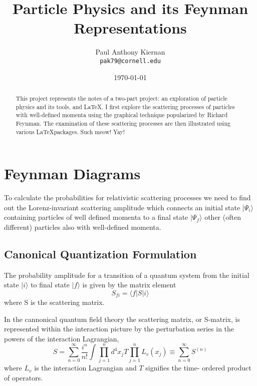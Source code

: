\documentclass[10pt,a4paper]{article}
\title{Particle Physics and its Feynman Representations}
\author{
    Paul Anthony Kiernan \\
    \texttt{pak79@cornell.edu}
}
\date{\today}
\begin{document}
    \unitlength=1mm

\maketitle

\begin{abstract}
    This project represents the notes of a two-part project: an exploration of
    particle physics and its tools, and \LaTeX. I first explore the scattering
    processes of particles with well-defined momenta using the graphical
    technique popularized by Richard Feynman. The examination of these
    scattering processes are then illustrated using various \LaTeX  packages.
    \newline
    \newline
    Such meow! Yay!
\end{abstract}

\tableofcontents
\listoffigures

\newpage
\section{Feynman Diagrams}

    To calculate the probabilities for relativistic scattering processes we
    need to find out the Lorenz-invariant scattering amplitude which connects
    an initial state $|\Psi_{i}\rangle$ containing particles of well defined
    momenta to a final state $|\Psi_{f}\rangle$ other (often different)
    particles also with well-defined momenta.

    \subsection{Canonical Quantization Formulation}
        The probability amplitude for a transition of a quantum system from the
        initial state $|i\rangle$ to final state $|f\rangle$ is given by the
        matrix element
            \begin{equation}
                S_{fi} = \langle f | S | i \rangle
            \end{equation}
        where S is the scattering matrix.

        In the cannonical quantum field theory the scattering matrix, or
        S-matrix, is represented within the interaction picture by the
        perturbation series in the powers of the interaction Lagrangian,
            \begin{equation}
                S = \sum_{n=0}^{\infty} \frac{i^{n}}{n!} 
                    \int \prod_{j=1}^{n} d^4 x_j T  \prod_{j=1}^{n} L_v (x_j)
                    \equiv \sum_{n=0}^{\infty} S^{(n)}
            \end{equation}
        where $L_v$ is the interaction Lagrangian and $T$ signifies the time-
        ordered product of operators.
\end{document}

